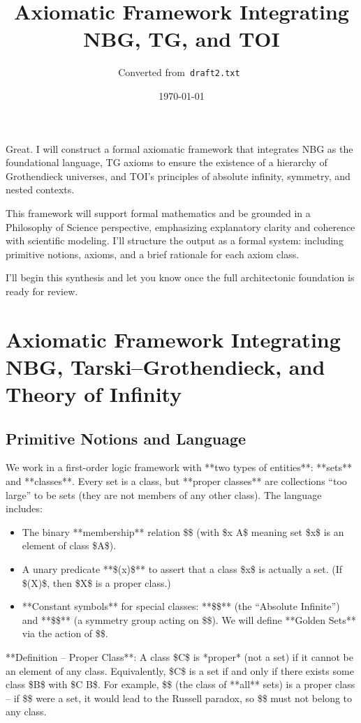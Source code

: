 \documentclass[11pt]{article}
\title{\Huge\bfseries Axiomatic Framework Integrating NBG, TG, and TOI}
\author{Converted from\texttt{ draft2.txt }}
\date{\today}
\begin{document}
\maketitle
Great. I will construct a formal axiomatic framework that integrates NBG as the foundational language, TG axioms to ensure the existence of a hierarchy of Grothendieck universes, and TOI’s principles of absolute infinity, symmetry, and nested contexts.

This framework will support formal mathematics and be grounded in a Philosophy of Science perspective, emphasizing explanatory clarity and coherence with scientific modeling. I’ll structure the output as a formal system: including primitive notions, axioms, and a brief rationale for each axiom class.

I'll begin this synthesis and let you know once the full architectonic foundation is ready for review.


\section*{Axiomatic Framework Integrating NBG, Tarski–Grothendieck, and Theory of Infinity}

\subsection*{Primitive Notions and Language}

We work in a first-order logic framework with **two types of entities**: **sets** and **classes**. Every set is a class, but **proper classes** are collections “too large” to be sets (they are not members of any other class). The language includes:

\begin{itemize}
  \item The binary **membership** relation \$\in\$ (with \$x \in A\$ meaning set \$x\$ is an element of class \$A\$).
  \item A unary predicate **\$(x)\$** to assert that a class \$x\$ is actually a set. (If \$\neg{}(X)\$, then \$X\$ is a proper class.)
  \item **Constant symbols** for special classes: **\$\infty\$** (the “Absolute Infinite”) and **\$\Sym\$** (a symmetry group acting on \$\infty\$). We will define **Golden Sets** via the action of \$\Sym\$.

\end{itemize}
**Definition – Proper Class**: A class \$C\$ is *proper* (not a set) if it cannot be an element of any class. Equivalently, \$C\$ is a set if and only if there exists some class \$B\$ with \$C \in B\$. For example, \$\infty\$ (the class of **all** sets) is a proper class – if \$\infty\$ were a set, it would lead to the Russell paradox, so \$\infty\$ must not belong to any class.
\end{document}
